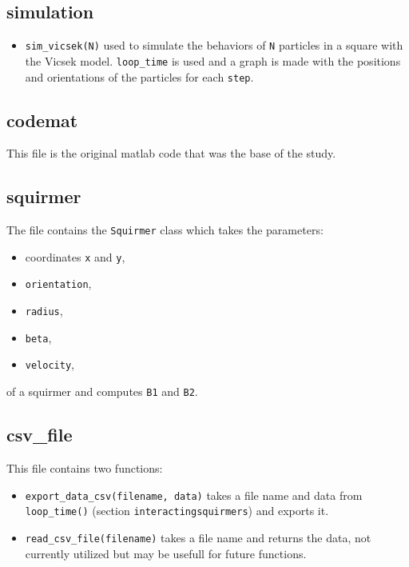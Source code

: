 \documentclass{article}
\begin{document}
\subsection*{simulation}
\begin{itemize}
   \item \texttt{sim\_vicsek(N)} used to simulate the behaviors of \texttt{N} particles in a square with the Vicsek model. \texttt{loop\_time} is 
   used and a graph is made with
   the positions and orientations of the particles for each \texttt{step}.
\end{itemize}

\subsection*{codemat}
This file is the original matlab code that was the base of the study.

\subsection*{squirmer}
The file contains the \texttt{Squirmer} class which takes the parameters: 
\begin{itemize}
   \item coordinates \texttt{x} and \texttt{y},
   \item \texttt{orientation},
   \item \texttt{radius},
   \item \texttt{beta},
   \item \texttt{velocity},
\end{itemize}
of a squirmer and computes \texttt{B1} and \texttt{B2}.

\subsection*{csv\_file}
This file contains two functions:
\begin{itemize}
   \item \texttt{export\_data\_csv(filename, data)} takes a file name and data from \texttt{loop\_time()} (section \texttt{interactingsquirmers}) and exports it.
   \item \texttt{read\_csv\_file(filename)} takes a file name and returns the data, not currently utilized but may be usefull for future functions.
\end{itemize}
\end{document}
